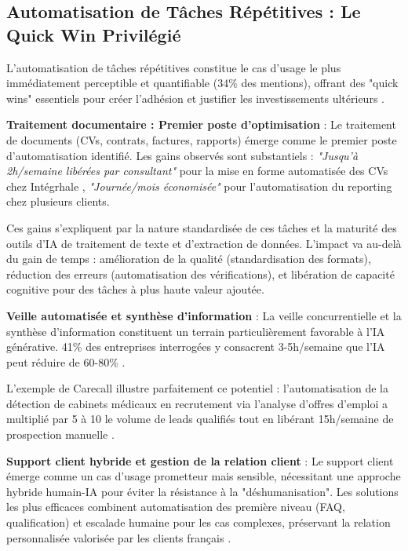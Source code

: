 \subsection{Automatisation de Tâches Répétitives : Le Quick Win Privilégié}

L'automatisation de tâches répétitives constitue le cas d'usage le plus immédiatement perceptible et quantifiable (34\% des mentions), offrant des "quick wins" essentiels pour créer l'adhésion et justifier les investissements ultérieurs \cite{luwai2025meetings}.

\textbf{Traitement documentaire : Premier poste d'optimisation} : Le traitement de documents (CVs, contrats, factures, rapports) émerge comme le premier poste d'automatisation identifié. Les gains observés sont substantiels : \emph{"Jusqu'à 2h/semaine libérées par consultant"} pour la mise en forme automatisée des CVs chez Intégrhale \cite{luwai2025integrhale}, \emph{"Journée/mois économisée"} pour l'automatisation du reporting chez plusieurs clients.

Ces gains s'expliquent par la nature standardisée de ces tâches et la maturité des outils d'IA de traitement de texte et d'extraction de données. L'impact va au-delà du gain de temps : amélioration de la qualité (standardisation des formats), réduction des erreurs (automatisation des vérifications), et libération de capacité cognitive pour des tâches à plus haute valeur ajoutée.

\textbf{Veille automatisée et synthèse d'information} : La veille concurrentielle et la synthèse d'information constituent un terrain particulièrement favorable à l'IA générative. 41\% des entreprises interrogées y consacrent 3-5h/semaine que l'IA peut réduire de 60-80\% \cite{luwai2025meetings}.

L'exemple de Carecall illustre parfaitement ce potentiel : l'automatisation de la détection de cabinets médicaux en recrutement via l'analyse d'offres d'emploi a multiplié par 5 à 10 le volume de leads qualifiés tout en libérant 15h/semaine de prospection manuelle \cite{luwai2025carecall}.

\textbf{Support client hybride et gestion de la relation client} : Le support client émerge comme un cas d'usage prometteur mais sensible, nécessitant une approche hybride humain-IA pour éviter la résistance à la "déshumanisation". Les solutions les plus efficaces combinent automatisation des première niveau (FAQ, qualification) et escalade humaine pour les cas complexes, préservant la relation personnalisée valorisée par les clients français \cite{meyer2014culture}.


